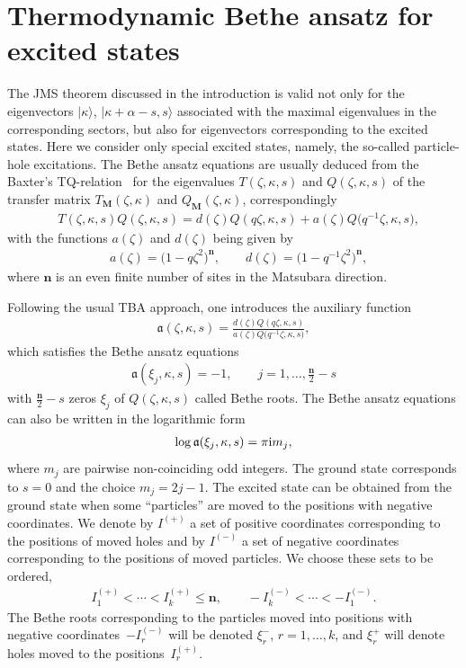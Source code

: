 \documentclass[pdftex]{sigma}
\numberwithin{equation}{section}
\begin{document}
\section{Thermodynamic Bethe ansatz for excited states}\label{section:TBA}
The JMS theorem discussed in the introduction is valid not only for the eigenvectors $|\kappa\rangle$, $|{\kappa+\alpha-s}, s\rangle$ associated with the maximal eigenvalues in the corresponding sectors, but also for eigenvectors corresponding to the excited states. Here we consider only special excited states, namely, the so-called particle-hole excitations. The Bethe ansatz equations are usually deduced from the Baxter's TQ-relation~\cite{Baxter} for the eigenvalues $T(\zeta, \kappa, s)$ and $Q(\zeta, \kappa, s)$ of the transfer matrix $T_{\textbf{M}}(\zeta, \kappa)$ and $Q_{\textbf{M}}(\zeta, \kappa)$, correspondingly
\begin{align*}
&T(\zeta, \kappa, s)Q(\zeta, \kappa, s) = d(\zeta)Q(q\zeta, \kappa, s) + a(\zeta)Q\bigl(q^{-1}\zeta, \kappa, s\bigr),
\end{align*}
with the functions $a(\zeta)$ and $d(\zeta)$ being given by
\begin{align*}
&a(\zeta)=\bigl(1-q\zeta^2\bigr)^{\textbf{n}},
\qquad
 d(\zeta)=\bigl(1-q^{-1}\zeta^2\bigr)^{\textbf{n}},
\end{align*}
where $\textbf{n}$ is an even finite number of sites in the Matsubara direction.

Following the usual TBA approach, one introduces the auxiliary function
\begin{align*}
\mathfrak{a}(\zeta, \kappa, s)=\frac{d(\zeta) Q(q\zeta, \kappa, s)}{a(\zeta) Q\bigl(q^{-1}\zeta, \kappa, s\bigr)},
\end{align*}
which satisfies the Bethe ansatz equations
\begin{align*}
\mathfrak{a}(\xi_j, \kappa, s)=-1, \qquad j=1, \dots, \frac{\textbf{n}}{2}-s
\end{align*}
with $\frac{\textbf{n}}{2}-s$ zeros $\xi_j$ of $Q(\zeta, \kappa, s)$ called Bethe roots. The Bethe ansatz equations can also be written in the logarithmic form
\begin{align}\label{1_BAE_Log}
\log\mathfrak{a}(\xi_j, \kappa, s)=\pi {\rm i} m_j,
\end{align}
where $m_j$ are pairwise non-coinciding odd integers. The ground state corresponds to $s=0$ and the choice $m_j=2j-1$. The excited state can be obtained from the ground state when some ``particles'' are moved to the positions with negative coordinates. We denote by $I^{(+)}$ a set of positive coordinates corresponding to the positions of moved holes and by $I^{(-)}$ a set of negative coordinates corresponding to the positions of moved particles. We choose these sets to be ordered,
\begin{align*}
I^{(+)}_1 < \cdots <  I^{(+)}_k \leq \textbf{n}, \qquad
-I^{(-)}_k < \cdots < -I^{(-)}_1.
\end{align*}
The Bethe roots corresponding to the particles moved into positions with negative coordinates~$-I^{(-)}_r$ will be denoted $\xi^-_r$, $r=1, \dots, k$, and $\xi_r^+$ will denote holes moved to the positions~$I_r^{(+)}$.
\end{document}
